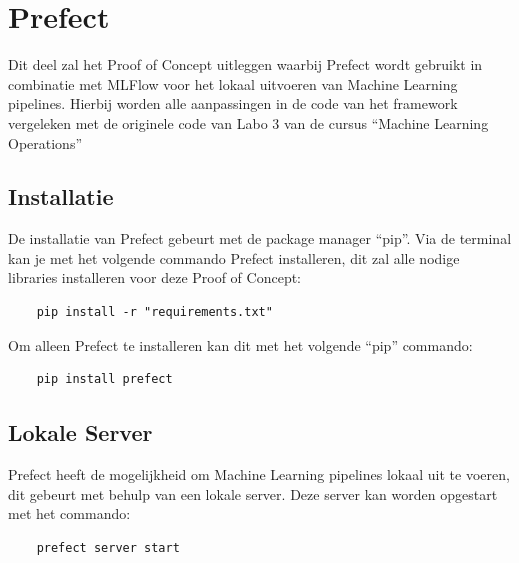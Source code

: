 \section{Prefect}
Dit deel zal het Proof of Concept uitleggen waarbij Prefect wordt gebruikt in combinatie met MLFlow voor het lokaal uitvoeren van Machine Learning pipelines. Hierbij worden alle aanpassingen in de code van het framework vergeleken met de originele code van Labo 3 van de cursus ``Machine Learning Operations''
\subsection{Installatie}
De installatie van Prefect gebeurt met de package manager ``pip''. Via de terminal kan je met het volgende commando Prefect installeren, dit zal alle nodige libraries installeren voor deze Proof of Concept:
\begin{verbatim}
    pip install -r "requirements.txt"
\end{verbatim}

Om alleen Prefect te installeren kan dit met het volgende ``pip'' commando:
\begin{verbatim}
    pip install prefect
\end{verbatim}

\subsection{Lokale Server}
Prefect heeft de mogelijkheid om Machine Learning pipelines lokaal uit te voeren, dit gebeurt met behulp van een lokale server. Deze server kan worden opgestart met het commando:
\begin{verbatim}
    prefect server start
\end{verbatim}

